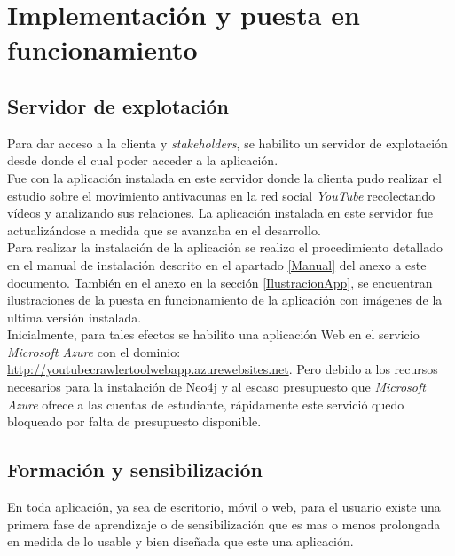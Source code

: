 \documentclass[11pt,a4paper]{article}
\begin{document}
\newpage 


\section{Implementación y puesta en funcionamiento}
\bigskip 

\subsection{Servidor de explotación}
Para dar acceso a la clienta y \textit{stakeholders}, se habilito un servidor de explotación desde donde el cual poder acceder a la aplicación.
\\

Fue con la aplicación instalada en este servidor donde la clienta pudo realizar el estudio sobre el movimiento antivacunas en la red social \textit{YouTube} recolectando vídeos y analizando sus relaciones. La aplicación instalada en este servidor fue actualizándose a medida que se avanzaba en el desarrollo.
\\

Para realizar la instalación de la aplicación se realizo el procedimiento detallado en el manual de instalación descrito en el apartado \ref{Manual} del anexo a este documento. También en el anexo en la sección \ref{IlustracionApp}, se encuentran ilustraciones de la puesta en funcionamiento de la aplicación con imágenes de la ultima versión instalada.
\\

Inicialmente, para tales efectos se habilito una aplicación Web en el servicio \textit{Microsoft Azure} con el dominio: \url{http://youtubecrawlertoolwebapp.azurewebsites.net}. Pero debido a los recursos necesarios para la instalación de Neo4j y al escaso presupuesto que \textit{Microsoft Azure} ofrece a las cuentas de estudiante, rápidamente este servició quedo bloqueado por falta de presupuesto disponible.
\\

\medskip 

\subsection{Formación y sensibilización}
En toda aplicación, ya sea de escritorio, móvil o web, para el usuario existe una primera fase de aprendizaje o de sensibilización que es mas o menos prolongada en medida de lo usable y bien diseñada que este una aplicación.
\\
\end{document}

